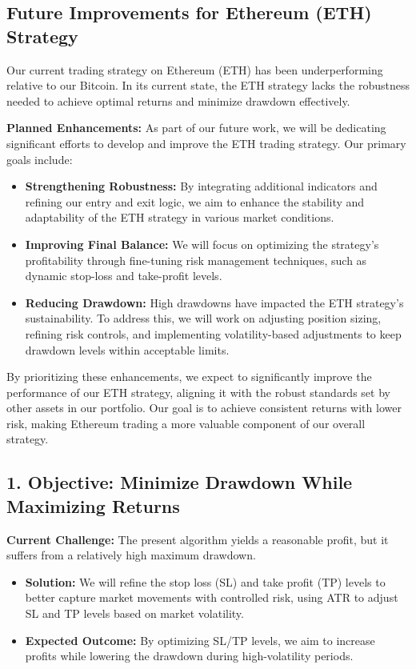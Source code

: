 \documentclass[12pt]{article}
\begin{document}
\subsection*{Future Improvements for Ethereum (ETH) Strategy}

Our current trading strategy on Ethereum (ETH) has been underperforming relative to our Bitcoin. In its current state, the ETH strategy lacks the robustness needed to achieve optimal returns and minimize drawdown effectively. 

\textbf{Planned Enhancements:}
As part of our future work, we will be dedicating significant efforts to develop and improve the ETH trading strategy. Our primary goals include:

\begin{itemize}
    \item \textbf{Strengthening Robustness:} By integrating additional indicators and refining our entry and exit logic, we aim to enhance the stability and adaptability of the ETH strategy in various market conditions.
    \item \textbf{Improving Final Balance:} We will focus on optimizing the strategy’s profitability through fine-tuning risk management techniques, such as dynamic stop-loss and take-profit levels.
    \item \textbf{Reducing Drawdown:} High drawdowns have impacted the ETH strategy's sustainability. To address this, we will work on adjusting position sizing, refining risk controls, and implementing volatility-based adjustments to keep drawdown levels within acceptable limits.
\end{itemize}

By prioritizing these enhancements, we expect to significantly improve the performance of our ETH strategy, aligning it with the robust standards set by other assets in our portfolio. Our goal is to achieve consistent returns with lower risk, making Ethereum trading a more valuable component of our overall strategy.




\subsection*{1. Objective: Minimize Drawdown While Maximizing Returns}
\textbf{Current Challenge:} The present algorithm yields a reasonable profit, but it suffers from a relatively high maximum drawdown.
\begin{itemize}
    \item \textbf{Solution:} We will refine the stop loss (SL) and take profit (TP) levels to better capture market movements with controlled risk, using ATR to adjust SL and TP levels based on market volatility.
    \item \textbf{Expected Outcome:} By optimizing SL/TP levels, we aim to increase profits while lowering the drawdown during high-volatility periods.
\end{itemize}
\end{document}
